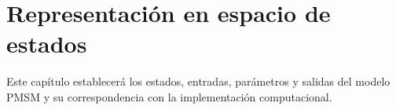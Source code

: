 \section{Representación en espacio de estados}

Este capítulo establecerá los estados, entradas, parámetros y salidas del modelo PMSM y su correspondencia con la implementación computacional.
